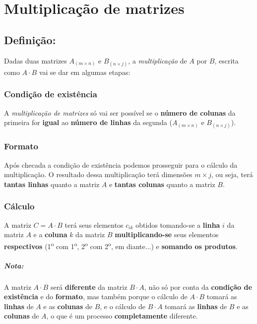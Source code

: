 \chapter{Multiplicação de matrizes}
\label{chap:multmat}

\section{Definição:}
Dadas duas matrizes $A_{(m \times n)}$  e $B_{(n \times j)}$, a \textit{multiplicação} de $A$ por $B$, escrita como $A\cdot B$ vai se dar em algumas etapas:

\subsection{Condição de existência}
A \textit{multiplicação de matrizes} só vai ser possível se o \textbf{número de colunas} da primeira for \textbf{igual} ao \textbf{número de linhas} da segunda ($A_{(m \times n)}$  e $B_{(n \times j)}$).

\subsection{Formato}
Após checada a condição de existência podemos prosseguir para o cálculo da multiplicação. O resultado dessa multiplicação terá dimensões $m \times j$, ou seja, terá \textbf{tantas linhas} quanto a matriz $A$ e \textbf{tantas colunas} quanto a matriz $B$.

\subsection{Cálculo}
A matriz $C=A\cdot B$ terá seus elementos $c_{ik}$ obtidos tomando-se a \textbf{linha} $i$ da matriz $A$ e a \textbf{coluna} $k$ da matriz $B$ \textbf{multiplicando-se} seus elementos \textbf{respectivos} (1\textsuperscript{o} com 1\textsuperscript{o}, 2\textsuperscript{o} com 2\textsuperscript{o}, em diante...) e \textbf{somando os produtos}.

\paragraph{Nota:}
A matriz $A\cdot B$ será \textbf{diferente} da matriz $B\cdot A$, não só por conta da \textbf{condição de existência} e do \textbf{formato}, mas também porque o cálculo de $A\cdot B$ tomará as \textbf{linhas} de $A$ e as \textbf{colunas} de $B$, e o cálculo de $B\cdot A$ tomará as \textbf{linhas} de $B$ e as \textbf{colunas} de $A$, o que é um processo \textbf{completamente} diferente.

